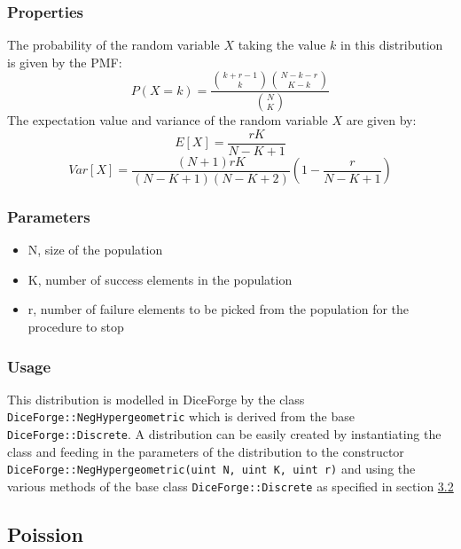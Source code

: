\documentclass[titlepage, 11pt]{article}
\newcommand{\code}[1]
{\colorbox{light-gray}{\texttt{#1}}}
\begin{document}
\subsubsection{Properties}
The probability of the random variable $X$ taking the value $k$ in this distribution is given by the PMF:
\begin{equation}
P(X = k) = \frac{\binom{k + r - 1}{k}\binom{N - k - r}{K - k}}{\binom{N}{K}}
\end{equation}
The expectation value and variance of the random variable $X$ are given by:
\begin{equation}
E\left[X\right] = \frac{rK}{N - K + 1}
\end{equation}
\begin{equation}
Var\left[X\right] = \frac{(N+1)rK}{(N - K + 1)(N - K + 2)}\left(1 - \frac{r}{N - K + 1}\right)
\end{equation}

\subsubsection{Parameters}
\begin{itemize}
    \item N, size of the population
    \item K, number of success elements in the population
    \item r, number of failure elements to be picked from the population for the procedure to stop
\end{itemize}

\subsubsection{Usage}
This distribution is modelled in DiceForge by the class \code{DiceForge::NegHypergeometric} which is derived from the base \code{DiceForge::Discrete}. A distribution can be easily created by instantiating the class and feeding in the parameters of the distribution to the constructor 
\code{DiceForge::NegHypergeometric(uint N, uint K, uint r)} and using the various methods of the base class \code{DiceForge::Discrete} as  specified in section \hyperref[sec:3.2]{3.2}
\newline


\subsection{Poission}
\end{document}

